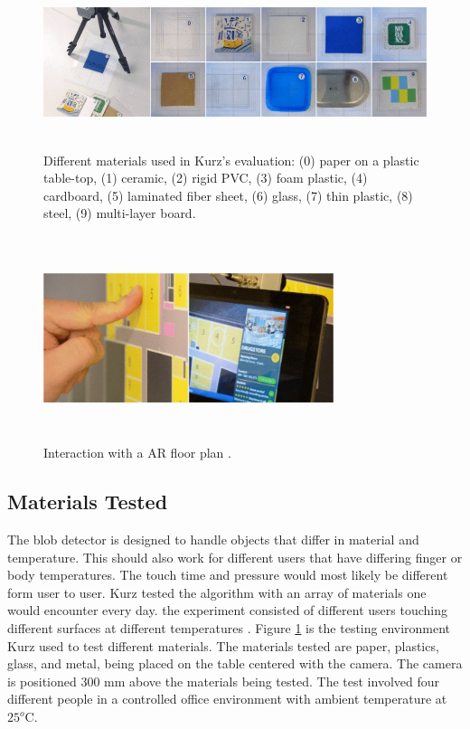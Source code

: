 \documentclass{sig-alternate}
\begin{document}
\begin{figure}
	\includegraphics[width=17.5cm, height=5cm]{ThermalTesting}
	\caption{Different materials used in Kurz's evaluation: (0) paper on a plastic table-top, (1) ceramic, (2) rigid PVC, (3) foam plastic, (4) cardboard, (5) laminated fiber sheet, (6) glass, (7) thin plastic, (8) steel, (9) multi-layer board. \cite{Thermal}}
	\label{fig:ThermalTest}
\end{figure}

\begin{figure}
	\includegraphics[width=8.5cm, height=6cm]{AugmentedFloorPlans}
	\caption{Interaction with a AR floor plan \cite{Thermal}.}
	\label{fig:FloorPlan}
\end{figure}

\subsection{Materials Tested}
\label{Materials Tested}
The blob detector is designed to handle objects that differ in material and temperature. This should also work for different users that have differing finger or body temperatures. The touch time and pressure would most likely be different form user to user. Kurz tested the algorithm with an array of materials one would encounter every day. the experiment consisted of different users touching different surfaces at different temperatures \cite{3D}. Figure \ref{fig:ThermalTest} is the testing environment Kurz used to test different materials. The materials tested are paper, plastics, glass, and metal, being placed on the table centered with the camera. The camera is positioned 300 mm above the materials being tested. The test involved four different people in a controlled office environment with ambient temperature at \(25^o\)C. 
\end{document}
